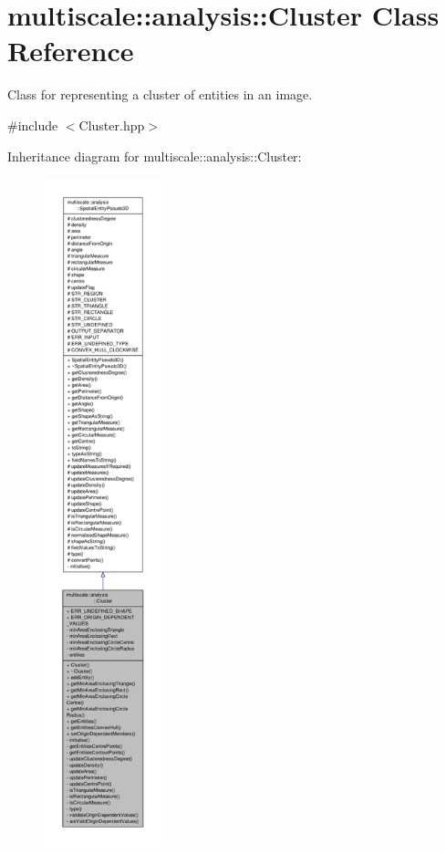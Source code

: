 \hypertarget{classmultiscale_1_1analysis_1_1Cluster}{\section{multiscale\-:\-:analysis\-:\-:Cluster Class Reference}
\label{classmultiscale_1_1analysis_1_1Cluster}
}


Class for representing a cluster of entities in an image.  




{\ttfamily \#include $<$Cluster.\-hpp$>$}



Inheritance diagram for multiscale\-:\-:analysis\-:\-:Cluster\-:\nopagebreak
\begin{figure}[H]
\begin{center}
\leavevmode
\includegraphics[height=550pt]{classmultiscale_1_1analysis_1_1Cluster__inherit__graph}
\end{center}
\end{figure}



